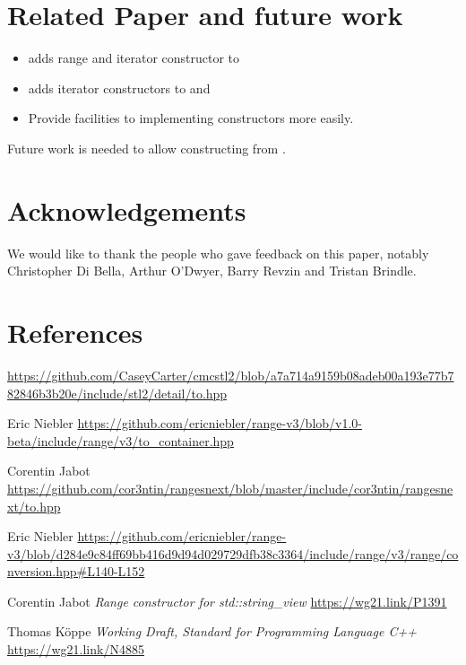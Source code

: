 \documentclass{wg21}
\begin{document}
\section{Related Paper and future work}

\begin{itemize}
	\item {} adds range and iterator constructor to 
    \item \cite{P1425} adds iterator constructors to  and 
    \item \cite{P1419} Provide facilities to implementing  constructors more easily.
\end{itemize}

Future work is needed to allow constructing  from .

\section{Acknowledgements}
We would like to thank the people who gave feedback on this paper, notably Christopher Di Bella, Arthur O'Dwyer, Barry Revzin
and Tristan Brindle.\\

\section{References}
\renewcommand{\section}[2]{}%


\begin{thebibliography}{9}


	\url{https://github.com/CaseyCarter/cmcstl2/blob/a7a714a9159b08adeb00a193e77b782846b3b20e/include/stl2/detail/to.hpp}

    Eric Niebler
	\url{https://github.com/ericniebler/range-v3/blob/v1.0-beta/include/range/v3/to_container.hpp}

Corentin Jabot
\url{https://github.com/cor3ntin/rangesnext/blob/master/include/cor3ntin/rangesnext/to.hpp}

Eric Niebler
\url{https://github.com/ericniebler/range-v3/blob/d284e9c84ff69bb416d9d94d029729dfb38c3364/include/range/v3/range/conversion.hpp#L140-L152}

	Corentin Jabot
	\emph{Range constructor for std::string\_view}\newline
	\url{https://wg21.link/P1391}

Thomas Köppe
\emph{Working Draft, Standard for Programming Language C++}\newline
\url{https://wg21.link/N4885}


\end{thebibliography}
\end{document}
